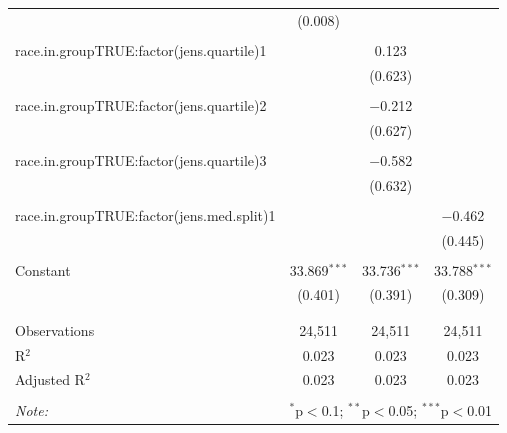 \begin{table}[!htbp]
\begin{tabular}{@{\extracolsep{5pt}}lccc}
  & (0.008) &  &  \\ 
  & & & \\ 
 race.in.groupTRUE:factor(jens.quartile)1 &  & 0.123 &  \\ 
  &  & (0.623) &  \\ 
  & & & \\ 
 race.in.groupTRUE:factor(jens.quartile)2 &  & $-$0.212 &  \\ 
  &  & (0.627) &  \\ 
  & & & \\ 
 race.in.groupTRUE:factor(jens.quartile)3 &  & $-$0.582 &  \\ 
  &  & (0.632) &  \\ 
  & & & \\ 
 race.in.groupTRUE:factor(jens.med.split)1 &  &  & $-$0.462 \\ 
  &  &  & (0.445) \\ 
  & & & \\ 
 Constant & 33.869$^{***}$ & 33.736$^{***}$ & 33.788$^{***}$ \\ 
  & (0.401) & (0.391) & (0.309) \\ 
  & & & \\ 
\hline \\[-1.8ex] 
Observations & 24,511 & 24,511 & 24,511 \\ 
R$^{2}$ & 0.023 & 0.023 & 0.023 \\ 
Adjusted R$^{2}$ & 0.023 & 0.023 & 0.023 \\ 
\hline 
\hline \\[-1.8ex] 
\textit{Note:}  & \multicolumn{3}{r}{$^{*}$p$<$0.1; $^{**}$p$<$0.05; $^{***}$p$<$0.01} \\ 
\end{tabular} 
\end{table} 
